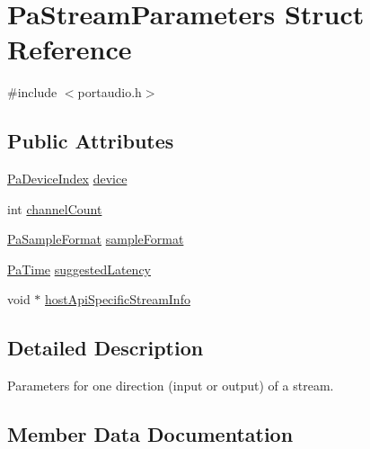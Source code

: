 \hypertarget{struct_pa_stream_parameters}{}\section{Pa\+Stream\+Parameters Struct Reference}
\label{struct_pa_stream_parameters}


{\ttfamily \#include $<$portaudio.\+h$>$}

\subsection*{Public Attributes}
\begin{DoxyCompactItemize}
\item 
\hyperlink{portaudio_8h_ad79317e65bde63d76c4b8e711ac5a361}{Pa\+Device\+Index} \hyperlink{struct_pa_stream_parameters_aebaf648b4d11dd1252a747b76b8da084}{device}
\item 
int \hyperlink{struct_pa_stream_parameters_a861ff361da71fc2572dd356c9c9878ca}{channel\+Count}
\item 
\hyperlink{portaudio_8h_a4582d93c2c2e60e12be3d74c5fe00b96}{Pa\+Sample\+Format} \hyperlink{struct_pa_stream_parameters_ad8d2d3063757b812f9e5f8709f41052b}{sample\+Format}
\item 
\hyperlink{portaudio_8h_af17a7e6d0471a23071acf8dbd7bbe4bd}{Pa\+Time} \hyperlink{struct_pa_stream_parameters_aa1e80ac0551162fd091db8936ccbe9a0}{suggested\+Latency}
\item 
void $\ast$ \hyperlink{struct_pa_stream_parameters_aff01b9fa0710ad1654471e97665c06a9}{host\+Api\+Specific\+Stream\+Info}
\end{DoxyCompactItemize}


\subsection{Detailed Description}
Parameters for one direction (input or output) of a stream. 

\subsection{Member Data Documentation}
\mbox{\label{struct_pa_stream_parameters_a861ff361da71fc2572dd356c9c9878ca}} 
